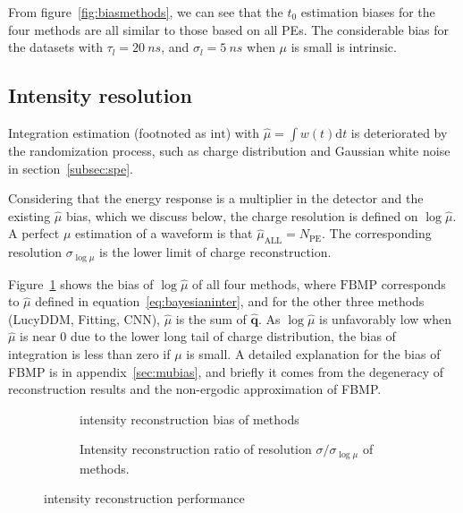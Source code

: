 From figure~\ref{fig:biasmethods}, we can see that the $t_0$ estimation biases for the four methods are all similar to those based on all PEs. The considerable bias for the datasets with $\tau_l=\SI{20}{ns}$, and $\sigma_l=\SI{5}{ns}$ when $\mu$ is small is intrinsic. 

\subsection{Intensity resolution}
\label{subsec:chargereconstruction}

Integration estimation (footnoted as $\mathrm{int}$) with $\hat{\mu}=\int w(t)\mathrm{d}t$ is deteriorated by the randomization process, such as charge distribution and Gaussian white noise in section~\ref{subsec:spe}. 

Considering that the energy response is a multiplier in the detector and the existing $\hat{\mu}$ bias, which we discuss below, the charge resolution is defined on $\log{\hat{\mu}}$. A perfect $\mu$ estimation of a waveform is that $\hat{\mu}_\mathrm{ALL}=N_\mathrm{PE}$. The corresponding resolution $\sigma_{\log\mu}$ is the lower limit of charge reconstruction. 

Figure~\ref{fig:biasmu} shows the bias of $\log\hat{\mu}$ of all four methods, where $\mathrm{FBMP}$ corresponds to $\hat{\mu}$ defined in equation~\eqref{eq:bayesianinter}, and for the other three methods (LucyDDM, Fitting, CNN), $\hat{\mu}$ is the sum of $\hat{\bm{q}}$. As $\log\hat{\mu}$ is unfavorably low when $\hat{\mu}$ is near 0 due to the lower long tail of charge distribution, the bias of integration is less than zero if $\mu$ is small. A detailed explanation for the bias of FBMP is in appendix~\ref{sec:mubias}, and briefly it comes from the degeneracy of reconstruction results and the non-ergodic approximation of FBMP. 

\begin{figure}[H]
  \begin{subfigure}[b]{\textwidth}
    \centering
    \resizebox{\textwidth}{!}{}
    \caption{\label{fig:biasmu} intensity reconstruction bias of methods}
  \end{subfigure}
  \begin{subfigure}[b]{\textwidth}
    \centering
    \resizebox{\textwidth}{!}{}
    \caption{\label{fig:deltamu} Intensity reconstruction ratio of resolution $\sigma/\sigma_{\log\mu}$ of methods. }
  \end{subfigure}
  \caption{intensity reconstruction performance}
\end{figure}

